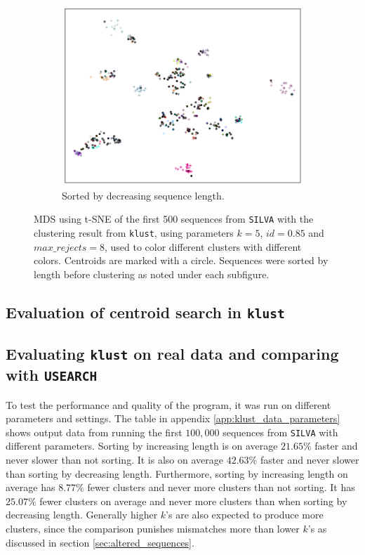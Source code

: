 \clearpage
\begin{figure}[H]
  \ContinuedFloat
  \begin{subfigure}[b]{1.0\textwidth}
    \includegraphics[width=1.0\textwidth]{graphics/SILVA_t-SNE_decr_sort_500.png}
    \caption{Sorted by decreasing sequence length.}
    \label{fig:mds_silva_sort_decr}
  \end{subfigure}
  \caption{MDS using t-SNE of the first 500 sequences from \texttt{SILVA} with
    the clustering result from \texttt{klust}, using parameters $k=5$,
    $id=0.85$ and $max\_rejects=8$, used to color different clusters with
    different colors. Centroids are marked with a circle. Sequences were sorted
    by length before clustering as noted under each subfigure.}
  \label{fig:mds_silva}
\end{figure}


\subsection{Evaluation of centroid search in \texttt{klust}}



\subsection{Evaluating \texttt{klust} on real data and comparing with \texttt{USEARCH}}

To test the performance and quality of the program, it was run on different
parameters and settings. The table in appendix \ref{app:klust_data_parameters}
shows output data from running the first $100,000$ sequences from
\texttt{SILVA} with different parameters. Sorting by increasing length is on
average $21.65\%$ faster and never slower than not sorting. It is also on
average $42.63\%$ faster and never slower than sorting by decreasing length.
Furthermore, sorting by increasing length on average has $8.77\%$ fewer
clusters and never more clusters than not sorting. It has $25.07\%$ fewer
clusters on average and never more clusters than when sorting by decreasing
length. Generally higher $k$'s are also expected to produce more clusters,
since the comparison punishes mismatches more than lower $k$'s as discussed in
section \ref{sec:altered_sequences}.


